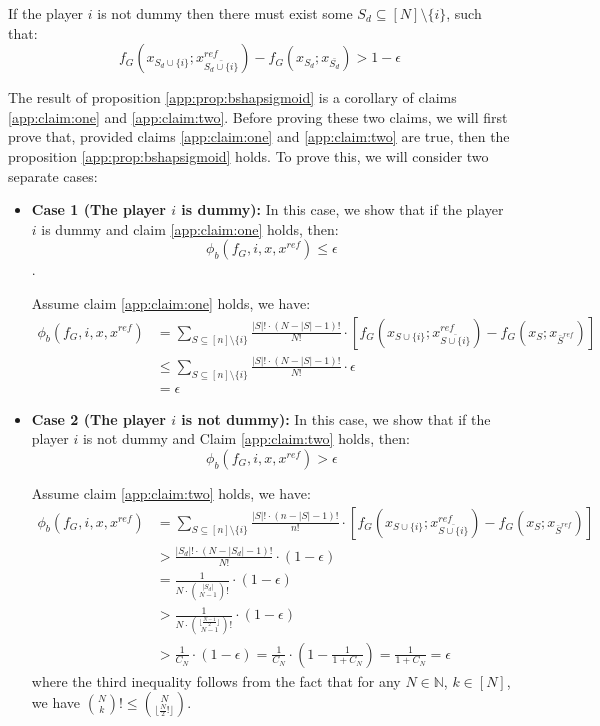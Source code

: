  \begin{claim} \label{app:claim:two}
  If the player $i$ is not dummy then there must exist some $S_{d} \subseteq [N] \setminus \{i\}$, such that: 
  \begin{equation} \label{app:eq:claim2}
    f_{G}(x_{S_{d} \cup \{i\}};x_{\bar{S_{d} \cup \{i\}}}^{ref}) - f_{G}(x_{S_{d}}; x_{\bar{S_{d}}}) > 1 - \epsilon
    \end{equation}
 \end{claim}
The result of proposition \ref{app:prop:bshapsigmoid} is a corollary of claims \ref{app:claim:one} and \ref{app:claim:two}. Before proving these two claims, we will first prove that, provided claims \ref{app:claim:one} and  \ref{app:claim:two} are true, then the proposition \ref{app:prop:bshapsigmoid} holds.  To prove this, we will consider two separate cases:
\begin{itemize}
    \item \textbf{Case 1 (The player $i$ is dummy):} In this case, we show that if the player $i$ is dummy and claim \ref{app:claim:one} holds, then: 
      $$\phi_{b}(f_{G}, i , x, x^{ref}) \leq \epsilon$$. 
    
Assume claim \ref{app:claim:one} holds, we have:
    \begin{align*} 
    \phi_b(f_{G},i,x,x^{ref}) &= \sum_{S \subseteq [n] \setminus \{i\}} \frac{|S|!\cdot (N - |S| - 1)!}{N!} \cdot \left[ f_{G}(x_{S \cup \{i\}};x_{\bar{S \cup \{i\}}}^{ref}) - f_{G}(x_{S}; x_{\bar{S}^{ref}})  \right] \\
    & \leq \sum_{S \subseteq [n] \setminus \{i\}} \frac{|S|!\cdot (N - |S| - 1)!}{N!} \cdot \epsilon \\
    & = \epsilon
    \end{align*}

\item \textbf{Case 2 (The player $i$ is not dummy):} In this case, we show that if the player $i$ is not dummy and Claim \ref{app:claim:two} holds, then: 
$$\phi_{b}(f_{G},i,x,x^{ref}) > \epsilon$$

Assume claim \ref{app:claim:two} holds, we have:
\begin{align*}
    \phi_b(f_{G}, i , x, x^{ref}) &= \sum_{S \subseteq [n] \setminus \{i\}} \frac{|S|!\cdot (n - |S| - 1)!}{n!} \cdot \left[ f_{G}(x_{S \cup \{i\}};x_{\bar{S \cup \{i\}}}^{ref}) - f_{G}(x_{S}; x_{\bar{S}^{ref}})  \right]  \\
    &> \frac{|S_{d}|! \cdot (N - |S_{d}|-1)!}{N!} \cdot (1 - \epsilon) \\ 
    & = \frac{1}{N \cdot  \binom{|S_{d}|}{N-1}!}  \cdot (1 - \epsilon) \\
    &> \frac{1}{N \cdot \binom{\lfloor \frac{N-1}{2} \rfloor}{N-1}!} \cdot (1 - \epsilon) \ \\ 
    &> \frac{1}{C_{N}}  \cdot (1 - \epsilon) = \frac{1}{C_{N}} \cdot (1 - \frac{1}{1 + C_{N}}) = \frac{1}{1+C_{N}} = \epsilon
\end{align*}
where the third inequality follows from the fact that for any $N \in \mathbb{N}$, $k \in [N]$, we have $\binom{N}{k} ! \leq \binom{N}{\lfloor \frac{N}{2}! \rfloor}$.
\end{itemize}

